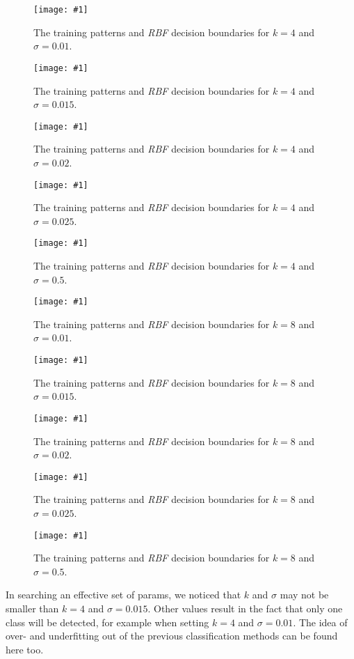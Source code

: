 \documentclass[a4paper,headings=small]{scrartcl}
\newcommand{\image}[3]{
\begin{figure}[htbp]
\centering
\texttt{[image: \#1]}
\caption{#3}
\label{fig:#1}
\end{figure}
}
\begin{document}
\image{out_classifierRbf_k_4_sigma_001}{\classifierPlotWidth}%
	{The training patterns and \emph{RBF} decision boundaries for $k = 4$ and $\sigma = 0.01$.}

\image{out_classifierRbf_k_4_sigma_0015}{\classifierPlotWidth}%
	{The training patterns and \emph{RBF} decision boundaries for $k = 4$ and $\sigma = 0.015$.}

\image{out_classifierRbf_k_4_sigma_002}{\classifierPlotWidth}%
	{The training patterns and \emph{RBF} decision boundaries for $k = 4$ and $\sigma = 0.02$.}

\image{out_classifierRbf_k_4_sigma_0025}{\classifierPlotWidth}%
	{The training patterns and \emph{RBF} decision boundaries for $k = 4$ and $\sigma = 0.025$.}

\image{out_classifierRbf_k_4_sigma_05}{\classifierPlotWidth}%
	{The training patterns and \emph{RBF} decision boundaries for $k = 4$ and $\sigma = 0.5$.}

\image{out_classifierRbf_k_8_sigma_001}{\classifierPlotWidth}%
	{The training patterns and \emph{RBF} decision boundaries for $k = 8$ and $\sigma = 0.01$.}

\image{out_classifierRbf_k_8_sigma_0015}{\classifierPlotWidth}%
	{The training patterns and \emph{RBF} decision boundaries for $k = 8$ and $\sigma = 0.015$.}

\image{out_classifierRbf_k_8_sigma_002}{\classifierPlotWidth}%
	{The training patterns and \emph{RBF} decision boundaries for $k = 8$ and $\sigma = 0.02$.}

\image{out_classifierRbf_k_8_sigma_0025}{\classifierPlotWidth}%
	{The training patterns and \emph{RBF} decision boundaries for $k = 8$ and $\sigma = 0.025$.}

\image{out_classifierRbf_k_8_sigma_05}{\classifierPlotWidth}%
	{The training patterns and \emph{RBF} decision boundaries for $k = 8$ and $\sigma = 0.5$.}

In searching an effective set of params, we noticed that $k$ and $\sigma$ may not be smaller than $k = 4$ and $\sigma = 0.015$.
Other values result in the fact that only one class will be detected,
for example when setting $k = 4$ and $\sigma = 0.01$.
The idea of over- and underfitting out of the previous classification methods can be found here too.
\end{document}
